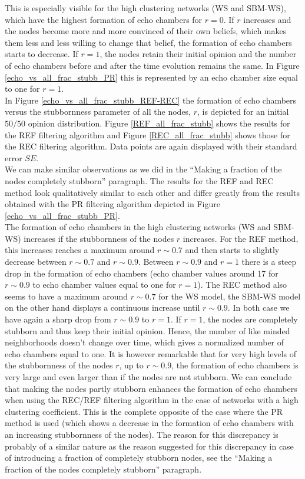 \documentclass[11 pt , letterpaper , twoside , openright]{book}
\begin{document}
This is especially visible for the high clustering networks (WS and SBM-WS), which have the highest formation of echo chambers for $r=0$. If $r$ increases and the nodes become more and more convinced of their own beliefs, which makes them less and less willing to change that belief, the formation of echo chambers starts to decrease. If $r=1$, the nodes retain their initial opinion and the number of echo chambers before and after the time evolution remains the same. In Figure \ref{echo_vs_all_frac_stubb_PR} this is represented by an echo chamber size equal to one for $r=1$.\\
\newline
In Figure \ref{echo_vs_all_frac_stubb_REF-REC} the formation of echo chambers versus the stubbornness parameter of all the nodes, $r$, is depicted for an initial $50/50$ opinion distribution. Figure \ref{REF_all_frac_stubb} shows the results for the REF filtering algorithm and Figure \ref{REC_all_frac_stubb} shows those for the REC filtering algorithm. Data points are again displayed with their standard error $SE$.\\
We can make similar observations as we did in the ``Making a fraction of the nodes completely stubborn'' paragraph. The results for the REF and REC method look qualitatively similar to each other and differ greatly from the results obtained with the PR filtering algorithm depicted in Figure \ref{echo_vs_all_frac_stubb_PR}.\\
The formation of echo chambers in the high clustering networks (WS and SBM-WS) increases if the stubbornness of the nodes $r$ increases. For the REF method, this increases reaches a maximum around $r \sim 0.7$ and then starts to slightly decrease between $r\sim 0.7$ and $r\sim 0.9$. Between $r \sim 0.9$ and $r=1$ there is a steep drop in the formation of echo chambers (echo chamber values around 17 for $r\sim 0.9$ to echo chamber values equal to one for $r=1$). The REC method also seems to have a maximum around $r \sim 0.7$ for the WS model, the SBM-WS model on the other hand displays a continuous increase until $r \sim 0.9$. In both case we have again a sharp drop from $r \sim 0.9$ to $r=1$. If $r=1$, the nodes are completely stubborn and thus keep their initial opinion. Hence, the number of like minded neighborhoods doesn't change over time, which gives a normalized number of echo chambers equal to one. It is however remarkable that for very high levels of the stubbornness of the nodes $r$, up to $r \sim 0.9$, the formation of echo chambers is very large and even larger than if the nodes are not stubborn. We can conclude that making the nodes partly stubborn enhances the formation of echo chambers when using the REC/REF filtering algorithm in the case of networks with a high clustering coefficient. This is the complete opposite of the case where the PR method is used (which shows a decrease in the formation of echo chambers with an increasing stubbornness of the nodes). The reason for this discrepancy is probably of a similar nature as the reason suggested for this discrepancy in case of introducing a fraction of completely stubborn nodes, see the ``Making a fraction of the nodes completely stubborn'' paragraph.\\
\end{document}
